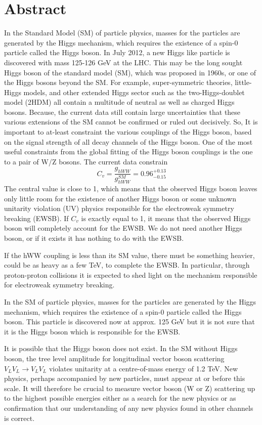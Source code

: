 \chapter*{Abstract}

In the Standard Model (SM) of particle physics, masses for the particles are generated by the Higgs mechanism, which requires the existence of a spin-0 particle called the Higgs boson. In July 2012, a new Higgs like particle is discovered with mass 125-126 GeV at the LHC. This may be the long sought Higgs boson of the standard model (SM), which was proposed in 1960s, or one of the Higgs bosons beyond the SM. For example, super-symmetric theories, little-Higgs models, and other extended Higgs sector such as the two-Higgs-doublet model (2HDM) all contain a multitude of neutral as well as charged Higgs bosons. Because, the current data still contain large uncertainties that these various extensions of the SM cannot be confirmed or ruled out decisively. So, It is important to at-least constraint the various couplings of the Higgs boson, based on the signal strength of all decay channels of the Higgs boson. One of the most useful constraints from the global fitting of the Higgs boson couplings is the one to a pair of W/Z bosons. The current data constrain
	\begin{equation}
	C_v = \frac{g_{hWW}}{g_{hWW}^{SM}}=0.96^{+0.13}_{-0.15}
	\end{equation}
The central value is close to 1, which means that the observed Higgs boson leaves only little room for the existence of another Higgs boson or some unknown unitarity violation (UV) physics responsible for the electroweak symmetry breaking (EWSB). If $C_v$ is exactly equal to 1, it means that the observed Higgs boson will completely account for the EWSB. We do not need another Higgs boson, or if it exists it has nothing to do with the EWSB.

If the hWW coupling is less than its SM value, there must be something heavier, could be as heavy as a few TeV, to complete the EWSB. 
In particular, through proton-proton collisions it is expected to shed light on the mechanism responsible for electroweak symmetry breaking. 

In the SM of particle physics, masses for the particles are generated by the Higgs mechanism, which requires the existence of a spin-0 particle called the Higgs boson. This particle is discovered now at approx. 125 GeV but it is not sure that it is the Higgs boson which is responsible for the EWSB.

It is possible that the Higgs boson does not exist. In the SM without Higgs boson, the tree level amplitude for longitudinal vector boson scattering $V_LV_L\rightarrow V_LV_L$ violates unitarity at a centre-of-mass energy of 1.2 TeV. New physics, perhaps accompanied by new particles, must appear at or before this scale. It will therefore be crucial to measure vector boson (W or Z) scattering up to the highest possible energies either as a search for the new physics or as confirmation that our understanding of any new physics found in other channels is correct.
